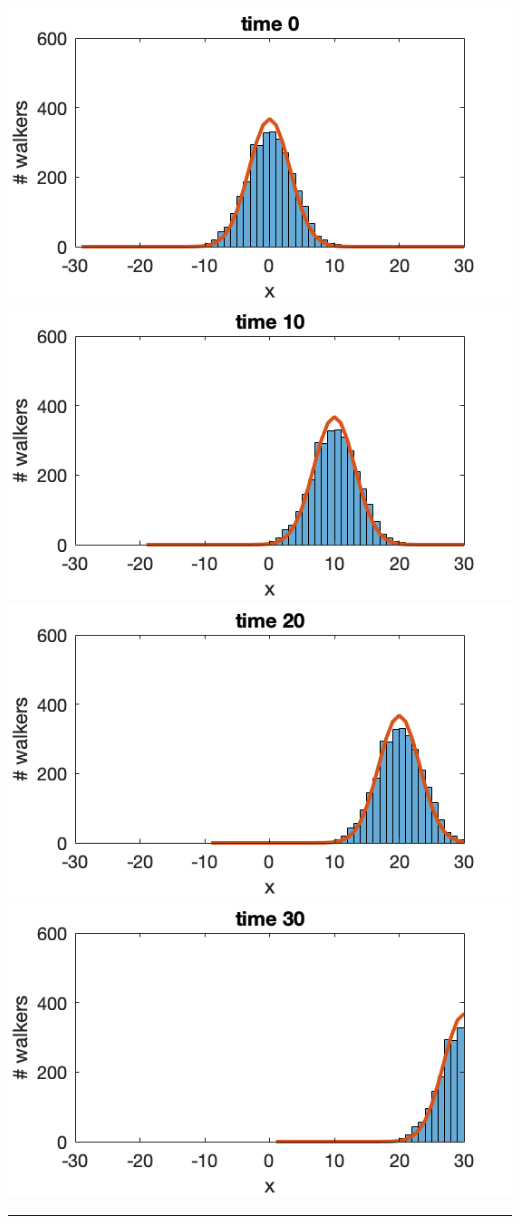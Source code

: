 \documentclass[12pt,letterpaper,noanswers]{exam}
\begin{document}
\vspace{2in}

\includegraphics[width=0.24\linewidth]{img/C37p1a.png}
\includegraphics[width=0.24\linewidth]{img/C37p1b.png}
\includegraphics[width=0.24\linewidth]{img/C37p1c.png}
\includegraphics[width=0.24\linewidth]{img/C37p1d.png}

\vspace{0.2cm}
\hrule
\vspace{0.2cm}
\eject



\end{document}
